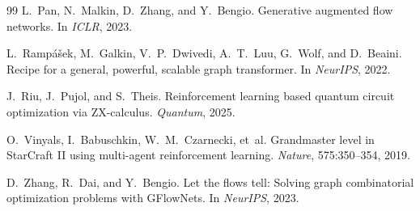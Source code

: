 \documentclass[11pt,a4paper]{article}
\begin{document}
\begin{thebibliography}{99}
L.~Pan, N.~Malkin, D.~Zhang, and Y.~Bengio.
\newblock Generative augmented flow networks.
\newblock In \emph{ICLR}, 2023.

L.~Ramp\'{a}\v{s}ek, M.~Galkin, V.~P.~Dwivedi, A.~T.~Luu, G.~Wolf, and D.~Beaini.
\newblock Recipe for a general, powerful, scalable graph transformer.
\newblock In \emph{NeurIPS}, 2022.

J.~Riu, J.~Pujol, and S.~Theis.
\newblock Reinforcement learning based quantum circuit optimization via {ZX}-calculus.
\newblock \emph{Quantum}, 2025.

O.~Vinyals, I.~Babuschkin, W.~M.~Czarnecki, et~al.
\newblock Grandmaster level in {StarCraft II} using multi-agent reinforcement learning.
\newblock \emph{Nature}, 575:350--354, 2019.

D.~Zhang, R.~Dai, and Y.~Bengio.
\newblock Let the flows tell: Solving graph combinatorial optimization problems with {GFlowNets}.
\newblock In \emph{NeurIPS}, 2023.

\end{thebibliography}
\end{document}
